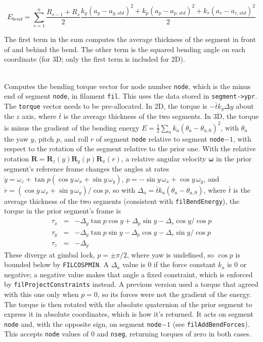 \documentclass {scrbook}
\newcommand {\ttt} {\texttt}
\begin{document}
\begin{description}
$$E_{bend}=\sum_{s=1}^{n} \frac{R_{s-1}+R_s}{2} \frac{k_y(a_y-a_{y, std})^2+k_p(a_p-a_{p, std})^2+k_r(a_r-a_{r, std})^2}{2}$$

The first term in the sum computes the average thickness of the segment in front of and behind the bend. The other term is the squared bending angle on each coordinate (for 3D; only the first term is included for 2D).

\item[\ttt{void filBendTorque(const filamentptr fil,int node,double *torque)}]
\hfill \\
Computes the bending torque vector for node number \ttt{node}, which is the minus end of segment \ttt{node}, in filament \ttt{fil}. This uses the data stored in \ttt{segment->ypr}. The \ttt{torque} vector needs to be pre-allocated. In 2D, the torque is $-\bar{t}k_y\Delta y$ about the $z$ axis, where $\bar{t}$ is the average thickness of the two segments. In 3D, the torque is minus the gradient of the bending energy $E=\frac{1}{2}\sum_a k_a(\theta_a-\theta_{a,0})^2$, with $\theta_a$ the yaw $y$, pitch $p$, and roll $r$ of segment \ttt{node} relative to segment \ttt{node}$-1$, with respect to the rotation of the segment relative to the prior one. With the relative rotation $\bm{R}=\bm{R}_z(y)\bm{R}_y(p)\bm{R}_x(r)$, a relative angular velocity $\bm{\omega}$ in the prior segment's reference frame changes the angles at rates $\dot{y}=\omega_z+\tan p(\cos y\,\omega_x+\sin y\,\omega_y)$, $\dot{p}=-\sin y\,\omega_x+\cos y\,\omega_y$, and $\dot{r}=(\cos y\,\omega_x+\sin y\,\omega_y)/\cos p$, so with $\Delta_a=\bar{t}k_a(\theta_a-\theta_{a,0})$, where $\bar{t}$ is the average thickness of the two segments (consistent with \ttt{filBendEnergy}), the torque in the prior segment's frame is
\begin{eqnarray*}
\tau_x &=& -\Delta_y\tan p\cos y+\Delta_p\sin y-\Delta_r\cos y/\cos p\\
\tau_y &=& -\Delta_y\tan p\sin y-\Delta_p\cos y-\Delta_r\sin y/\cos p\\
\tau_z &=& -\Delta_y
\end{eqnarray*}
These diverge at gimbal lock, $p=\pm\pi/2$, where yaw is undefined, so $\cos p$ is bounded below by \ttt{FILCOSPMIN}. A $\Delta_a$ value is 0 if the force constant $k_a$ is 0 or negative; a negative value makes that angle a fixed constraint, which is enforced by \ttt{filProjectConstraints} instead. A previous version used a torque that agreed with this one only when $p=0$, so its forces were not the gradient of the energy. The torque is then rotated with the absolute quaternion of the prior segment to express it in absolute coordinates, which is how it's returned. It acts on segment \ttt{node} and, with the opposite sign, on segment \ttt{node}$-1$ (see \ttt{filAddBendForces}). This accepts \ttt{node} values of 0 and \ttt{nseg}, returning torques of zero in both cases.



\end{description}
\end{document}
